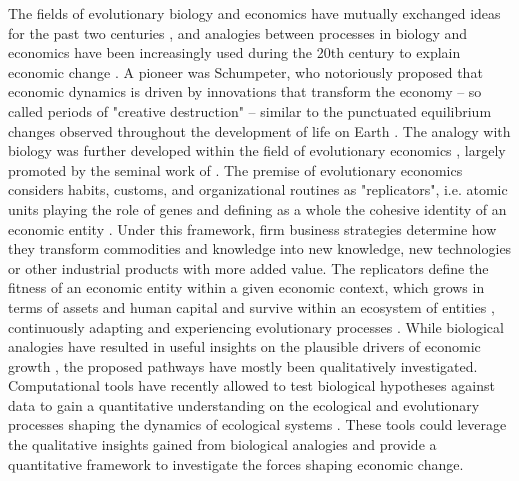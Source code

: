   The fields of evolutionary biology and economics have mutually exchanged ideas for the past two centuries \citep{Dopfer2007}, and analogies between processes in biology and economics have been increasingly used during the 20th century to explain economic change \citep{Ruth1996}.
  A pioneer was Schumpeter, who notoriously proposed that economic dynamics is driven by innovations that transform the economy -- so called periods of "creative destruction" \citep{schumpeter2017theory}-- similar to the punctuated equilibrium changes observed throughout the development of life on Earth \citep{gould1972}.
  The analogy with biology was further developed within the field of evolutionary economics \citep{Hodgson2019}, largely promoted by the seminal work of \cite{nelson1985evolutionary}.
  The premise of evolutionary economics considers habits, customs, and organizational routines as "replicators", i.e. atomic units playing the role of genes and defining as a whole the cohesive identity of an economic entity \citep{Hodgson2019}.
  Under this framework, firm business strategies determine how they transform commodities and knowledge into new knowledge, new technologies or other industrial products with more added value.
  The replicators define the fitness of an economic entity within a given economic context, which grows in terms of assets and human capital and survive within an ecosystem of entities \citep{Hodgson2002}, continuously adapting and experiencing evolutionary processes \citep{Veblen1898}.
  While biological analogies have resulted in useful insights on the plausible drivers of economic growth \citep{Dopfer2007}, the proposed pathways have mostly been qualitatively investigated.
  Computational tools have recently allowed to test biological hypotheses against data to gain a quantitative understanding on the ecological and evolutionary processes shaping the dynamics of ecological systems \citep{Pontarp2019,Boussange2022a,Skeels2022}. These tools could leverage the qualitative insights gained from biological analogies and provide a quantitative framework to investigate the forces shaping economic change.
  
